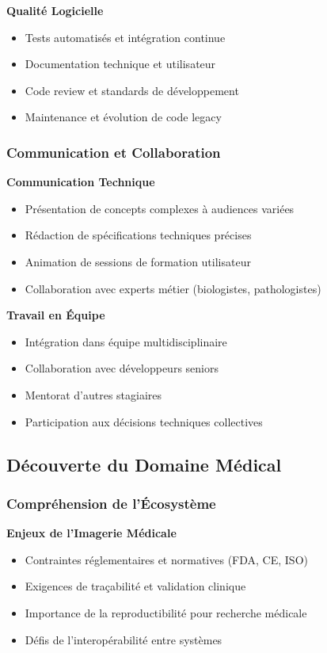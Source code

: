\documentclass[12pt,a4paper]{report}
\begin{document}
\textbf{Qualité Logicielle}
\begin{itemize}
\item Tests automatisés et intégration continue
\item Documentation technique et utilisateur
\item Code review et standards de développement
\item Maintenance et évolution de code legacy
\end{itemize}

\subsubsection{Communication et Collaboration}

\textbf{Communication Technique}
\begin{itemize}
\item Présentation de concepts complexes à audiences variées
\item Rédaction de spécifications techniques précises
\item Animation de sessions de formation utilisateur
\item Collaboration avec experts métier (biologistes, pathologistes)
\end{itemize}

\textbf{Travail en Équipe}
\begin{itemize}
\item Intégration dans équipe multidisciplinaire
\item Collaboration avec développeurs seniors
\item Mentorat d'autres stagiaires
\item Participation aux décisions techniques collectives
\end{itemize}

\subsection{Découverte du Domaine Médical}

\subsubsection{Compréhension de l'Écosystème}

\textbf{Enjeux de l'Imagerie Médicale}
\begin{itemize}
\item Contraintes réglementaires et normatives (FDA, CE, ISO)
\item Exigences de traçabilité et validation clinique
\item Importance de la reproductibilité pour recherche médicale
\item Défis de l'interopérabilité entre systèmes
\end{itemize}
\end{document}

